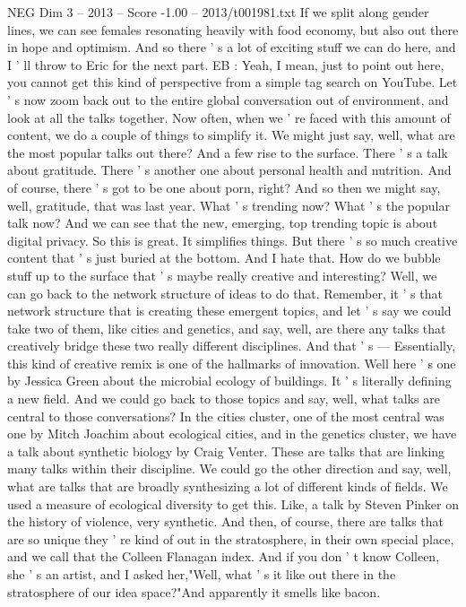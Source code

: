 \begin{textsample}{NEG Dim 3 – 2013 – Score -1.00 – 2013/t001981.txt}
If we split along gender lines, we can see females resonating heavily with food economy, but also out there in hope and optimism.
And so there ' s a lot of exciting stuff we can do here, and I ' ll throw to Eric for the next part.
EB : Yeah, I mean, just to point out here, you cannot get this kind of perspective from a simple tag search on YouTube.
Let ' s now zoom back out to the entire global conversation out of environment, and look at all the talks together.
Now often, when we ' re faced with this amount of content, we do a couple of things to simplify it.
We might just say, well, what are the most popular talks out there?
And a few rise to the surface.
There ' s a talk about gratitude.
There ' s another one about personal health and nutrition.
And of course, there ' s got to be one about porn, right?
And so then we might say, well, gratitude, that was last year.
What ' s trending now?
What ' s the popular talk now?
And we can see that the new, emerging, top trending topic is about digital privacy.
So this is great.
It simplifies things.
But there ' s so much creative content that ' s just buried at the bottom.
And I hate that.
How do we bubble stuff up to the surface that ' s maybe really creative and interesting?
Well, we can go back to the network structure of ideas to do that.
Remember, it ' s that network structure that is creating these emergent topics, and let ' s say we could take two of them, like cities and genetics, and say, well, are there any talks that creatively bridge these two really different disciplines.
And that ' s — Essentially, this kind of creative remix is one of the hallmarks of innovation.
Well here ' s one by Jessica Green about the microbial ecology of buildings.
It ' s literally defining a new field.
And we could go back to those topics and say, well, what talks are central to those conversations?
In the cities cluster, one of the most central was one by Mitch Joachim about ecological cities, and in the genetics cluster, we have a talk about synthetic biology by Craig Venter.
These are talks that are linking many talks within their discipline.
We could go the other direction and say, well, what are talks that are broadly synthesizing a lot of different kinds of fields.
We used a measure of ecological diversity to get this.
Like, a talk by Steven Pinker on the history of violence, very synthetic.
And then, of course, there are talks that are so unique they ' re kind of out in the stratosphere, in their own special place, and we call that the Colleen Flanagan index.
And if you don ' t know Colleen, she ' s an artist, and I asked her,"Well, what ' s it like out there in the stratosphere of our idea space?"And apparently it smells like bacon.

\end{textsample}
